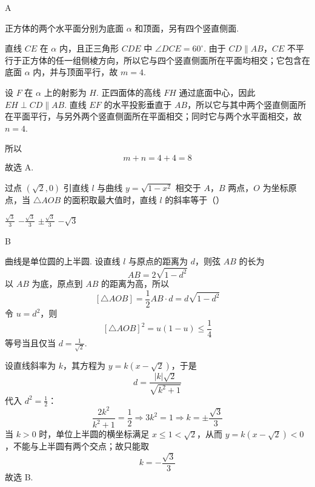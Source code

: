 \begin{answer}
A
\end{answer}

\begin{solution}
正方体的两个水平面分别为底面 \(\alpha\) 和顶面，另有四个竖直侧面.

直线 \(CE\) 在 \(\alpha\) 内，且正三角形 \(CDE\) 中 \(\angle DCE=60^{\circ}\). 由于 \(CD\parallel AB\)，\(CE\) 不平行于正方体的任一组侧棱方向，所以它与四个竖直侧面所在平面均相交；它包含在底面 \(\alpha\) 内，并与顶面平行，故 \(m=4\).

设 \(F\) 在 \(\alpha\) 上的射影为 \(H\). 正四面体的高线 \(FH\) 通过底面中心，因此 \(EH\perp CD\parallel AB\). 直线 \(EF\) 的水平投影垂直于 \(AB\)，所以它与其中两个竖直侧面所在平面平行，与另外两个竖直侧面所在平面相交；同时它与两个水平面相交，故 \(n=4\).

所以
\[
m+n=4+4=8
\]
故选 A.
\end{solution}

\begin{problem}
过点 \((\sqrt{2}, 0)\) 引直线 \(l\) 与曲线 \(y = \sqrt{1 - x^{2}}\) 相交于 \(A\)，\(B\) 两点，\(O\) 为坐标原点，当 \(\triangle AOB\) 的面积取最大值时，直线 \(l\) 的斜率等于（\quad）

\choices
    {\(\frac{\sqrt{3}}{3}\)}
    {\(-\frac{\sqrt{3}}{3}\)}
    {\(\pm \frac{\sqrt{3}}{3}\)}
    {\(-\sqrt{3}\)}
\end{problem}

\begin{answer}
B
\end{answer}

\begin{solution}
曲线是单位圆的上半圆. 设直线 \(l\) 与原点的距离为 \(d\)，则弦 \(AB\) 的长为
\[
AB=2\sqrt{1-d^2}
\]
以 \(AB\) 为底，原点到 \(AB\) 的距离为高，所以
\[
[\triangle AOB]=\frac12 AB\cdot d=d\sqrt{1-d^2}
\]
令 \(u=d^2\)，则
\[
[\triangle AOB]^2=u(1-u)\leqslant\frac14
\]
等号当且仅当 \(d=\frac{1}{\sqrt2}\).

设直线斜率为 \(k\)，其方程为 \(y=k(x-\sqrt2)\)，于是
\[
d=\frac{|k|\sqrt2}{\sqrt{k^2+1}}
\]
代入 \(d^2=\frac{1}{2}\)：
\[
\frac{2k^2}{k^2+1}=\frac12
\Longrightarrow
3k^2=1
\Longrightarrow
k=\pm\frac{\sqrt3}{3}
\]
当 \(k>0\) 时，单位上半圆的横坐标满足 \(x\leqslant1<\sqrt2\)，从而 \(y=k(x-\sqrt2)<0\)，不能与上半圆有两个交点；故只能取
\[
k=-\frac{\sqrt3}{3}
\]
故选 B.
\end{solution}

